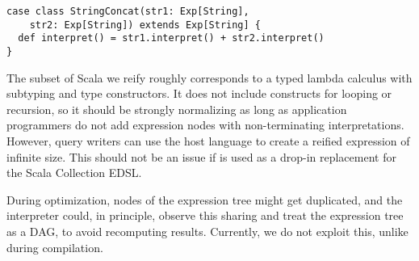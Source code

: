 \begin{lstlisting}
case class StringConcat(str1: Exp[String],
    str2: Exp[String]) extends Exp[String] {
  def interpret() = str1.interpret() + str2.interpret()
}
\end{lstlisting}

The subset of Scala we reify roughly corresponds to a typed lambda calculus with subtyping and type constructors. It does not include constructs for looping or recursion, so it should be strongly normalizing as long as application programmers do not add expression nodes with non-terminating interpretations. However, query writers can use the host language to create a reified expression of infinite size. This should not be an issue if {\LoS} is used as a drop-in replacement for the Scala Collection EDSL.

During optimization, nodes of the expression tree might get duplicated, and the
interpreter could, in principle, observe this sharing and treat the expression
tree as a DAG, to avoid recomputing results. Currently, we do not exploit this,
unlike during compilation.


